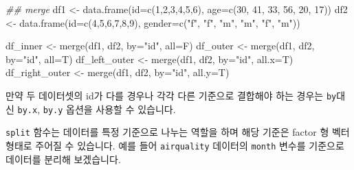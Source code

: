 \documentclass[
  a4paper,
]{book}
\newenvironment{Shaded}{\begin{snugshade}}{\end{snugshade}}
\newcommand{\AttributeTok}[1]{\textcolor[rgb]{0.40,0.45,0.13}{#1}}
\newcommand{\DecValTok}[1]{\textcolor[rgb]{0.68,0.00,0.00}{#1}}
\newcommand{\DocumentationTok}[1]{\textcolor[rgb]{0.37,0.37,0.37}{\textit{#1}}}
\newcommand{\FunctionTok}[1]{\textcolor[rgb]{0.28,0.35,0.67}{#1}}
\newcommand{\NormalTok}[1]{\textcolor[rgb]{0.00,0.23,0.31}{#1}}
\newcommand{\OtherTok}[1]{\textcolor[rgb]{0.00,0.23,0.31}{#1}}
\newcommand{\SpecialCharTok}[1]{\textcolor[rgb]{0.37,0.37,0.37}{#1}}
\newcommand{\StringTok}[1]{\textcolor[rgb]{0.13,0.47,0.30}{#1}}
\begin{document}
\begin{Shaded}
\begin{Highlighting}[]
\DocumentationTok{\#\# merge}
\NormalTok{df1 }\OtherTok{\textless{}{-}} \FunctionTok{data.frame}\NormalTok{(}\AttributeTok{id=}\FunctionTok{c}\NormalTok{(}\DecValTok{1}\NormalTok{,}\DecValTok{2}\NormalTok{,}\DecValTok{3}\NormalTok{,}\DecValTok{4}\NormalTok{,}\DecValTok{5}\NormalTok{,}\DecValTok{6}\NormalTok{), }\AttributeTok{age=}\FunctionTok{c}\NormalTok{(}\DecValTok{30}\NormalTok{, }\DecValTok{41}\NormalTok{, }\DecValTok{33}\NormalTok{, }\DecValTok{56}\NormalTok{, }\DecValTok{20}\NormalTok{, }\DecValTok{17}\NormalTok{))}
\NormalTok{df2 }\OtherTok{\textless{}{-}} \FunctionTok{data.frame}\NormalTok{(}\AttributeTok{id=}\FunctionTok{c}\NormalTok{(}\DecValTok{4}\NormalTok{,}\DecValTok{5}\NormalTok{,}\DecValTok{6}\NormalTok{,}\DecValTok{7}\NormalTok{,}\DecValTok{8}\NormalTok{,}\DecValTok{9}\NormalTok{), }\AttributeTok{gender=}\FunctionTok{c}\NormalTok{(}\StringTok{"f"}\NormalTok{, }\StringTok{"f"}\NormalTok{, }\StringTok{"m"}\NormalTok{, }\StringTok{"m"}\NormalTok{, }\StringTok{"f"}\NormalTok{, }\StringTok{"m"}\NormalTok{))}

\NormalTok{df\_inner }\OtherTok{\textless{}{-}} \FunctionTok{merge}\NormalTok{(df1, df2, }\AttributeTok{by=}\StringTok{"id"}\NormalTok{, }\AttributeTok{all=}\NormalTok{F)}
\NormalTok{df\_outer }\OtherTok{\textless{}{-}} \FunctionTok{merge}\NormalTok{(df1, df2, }\AttributeTok{by=}\StringTok{"id"}\NormalTok{, }\AttributeTok{all=}\NormalTok{T)}
\NormalTok{df\_left\_outer }\OtherTok{\textless{}{-}} \FunctionTok{merge}\NormalTok{(df1, df2, }\AttributeTok{by=}\StringTok{"id"}\NormalTok{, }\AttributeTok{all.x=}\NormalTok{T)}
\NormalTok{df\_right\_outer }\OtherTok{\textless{}{-}} \FunctionTok{merge}\NormalTok{(df1, df2, }\AttributeTok{by=}\StringTok{"id"}\NormalTok{, }\AttributeTok{all.y=}\NormalTok{T)}
\end{Highlighting}
\end{Shaded}

만약 두 데이터셋의 id가 다를 경우나 각각 다른 기준으로 결합해야 하는
경우는 \texttt{by}대신 \texttt{by.x}, \texttt{by.y} 옵션을 사용할 수
있습니다.

\texttt{split} 함수는 데이터를 특정 기준으로 나누는 역할을 하며 해당
기준은 factor 형 벡터 형태로 주어질 수 있습니다. 예를 들어
\texttt{airquality} 데이터의 \texttt{month} 변수를 기준으로 데이터를
분리해 보겠습니다.

\begin{Shaded}
\end{Shaded}
\end{document}
